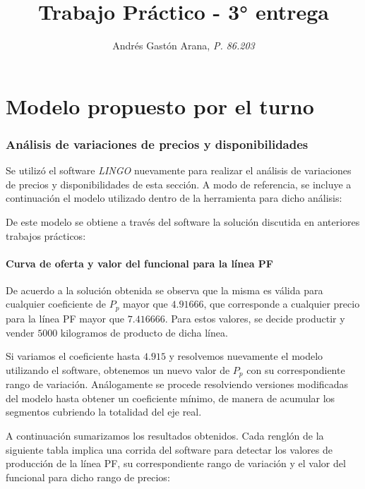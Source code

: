 \documentclass[a4paper,11pt]{article}
\title{\textbf{Trabajo Práctico} - 3° entrega}
\author{Andrés Gastón Arana, \textit{P. 86.203}}
\date{}
\begin{document}
\maketitle
\clearpage

\part{Modelo propuesto por el turno}

\section{Análisis de variaciones de precios y disponibilidades} \label{sec:original}

Se utilizó el software \textit{LINGO} nuevamente para realizar el análisis de
variaciones de precios y disponibilidades de esta sección. A modo de
referencia, se incluye a continuación el modelo utilizado dentro de la
herramienta para dicho análisis:



De este modelo se obtiene a través del software la solución discutida en
anteriores trabajos prácticos:



\subsection{Curva de oferta y valor del funcional para la línea PF}

De acuerdo a la solución obtenida se observa que la misma es válida para
cualquier coeficiente de \(P_p\) mayor que \(4.91666\), que corresponde a
cualquier precio para la línea PF mayor que \(7.416666\). Para estos valores,
se decide productir y vender \(5000\) kilogramos de producto de dicha línea.

Si variamos el coeficiente hasta \(4.915\) y resolvemos nuevamente el modelo
utilizando el software, obtenemos un nuevo valor de \(P_p\) con su
correspondiente rango de variación. Análogamente se procede resolviendo
versiones modificadas del modelo hasta obtener un coeficiente mínimo, de manera
de acumular los segmentos cubriendo la totalidad del eje real.

A continuación sumarizamos los resultados obtenidos. Cada renglón de la
siguiente tabla implica una corrida del software para detectar los valores de
producción de la línea PF, su correspondiente rango de variación y el valor del
funcional para dicho rango de precios:
\end{document}

